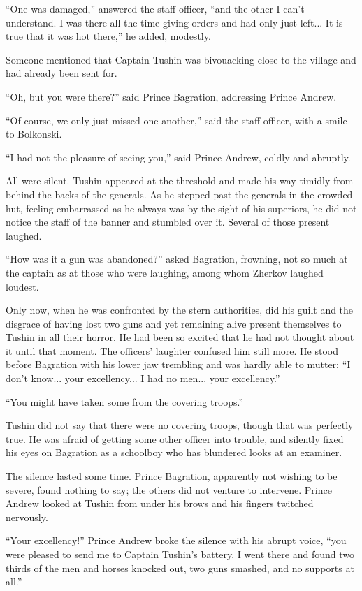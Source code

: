 ``One was damaged,'' answered the staff officer, ``and the other
I can't understand. I was there all the time giving orders and
had only just left... It is true that it was hot there,'' he
added, modestly.

Someone mentioned that Captain Tushin was bivouacking close to
the village and had already been sent for.

``Oh, but you were there?'' said Prince Bagration, addressing
Prince Andrew.

``Of course, we only just missed one another,'' said the staff
officer, with a smile to Bolkonski.

``I had not the pleasure of seeing you,'' said Prince Andrew,
coldly and abruptly.

All were silent. Tushin appeared at the threshold and made his
way timidly from behind the backs of the generals. As he stepped
past the generals in the crowded hut, feeling embarrassed as he
always was by the sight of his superiors, he did not notice the
staff of the banner and stumbled over it. Several of those
present laughed.

``How was it a gun was abandoned?'' asked Bagration, frowning,
not so much at the captain as at those who were laughing, among
whom Zherkov laughed loudest.

Only now, when he was confronted by the stern authorities, did
his guilt and the disgrace of having lost two guns and yet
remaining alive present themselves to Tushin in all their
horror. He had been so excited that he had not thought about it
until that moment. The officers' laughter confused him still
more. He stood before Bagration with his lower jaw trembling and
was hardly able to mutter: ``I don't know... your excellency... I
had no men... your excellency.''

``You might have taken some from the covering troops.''

Tushin did not say that there were no covering troops, though
that was perfectly true. He was afraid of getting some other
officer into trouble, and silently fixed his eyes on Bagration as
a schoolboy who has blundered looks at an examiner.

The silence lasted some time. Prince Bagration, apparently not
wishing to be severe, found nothing to say; the others did not
venture to intervene. Prince Andrew looked at Tushin from under
his brows and his fingers twitched nervously.

``Your excellency!'' Prince Andrew broke the silence with his
abrupt voice, ``you were pleased to send me to Captain Tushin's
battery. I went there and found two thirds of the men and horses
knocked out, two guns smashed, and no supports at all.''

